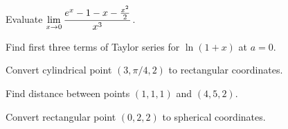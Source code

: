 \documentclass[11pt]{article}
\begin{document}
\begin{practice}

\prob Evaluate $\displaystyle\lim_{x\to 0}\frac{e^x-1-x-\frac{x^2}{2}}{x^3}$.


\vspace{2.5cm}

\prob Find first three terms of Taylor series for $\ln(1+x)$ at $a=0$.


\vspace{2.5cm}

\prob Convert cylindrical point $(3, \pi/4, 2)$ to rectangular coordinates.


\vspace{2.5cm}

\prob Find distance between points $(1,1,1)$ and $(4,5,2)$.


\vspace{2.5cm}

\prob Convert rectangular point $(0,2,2)$ to spherical coordinates.


\end{practice}
\end{document}
